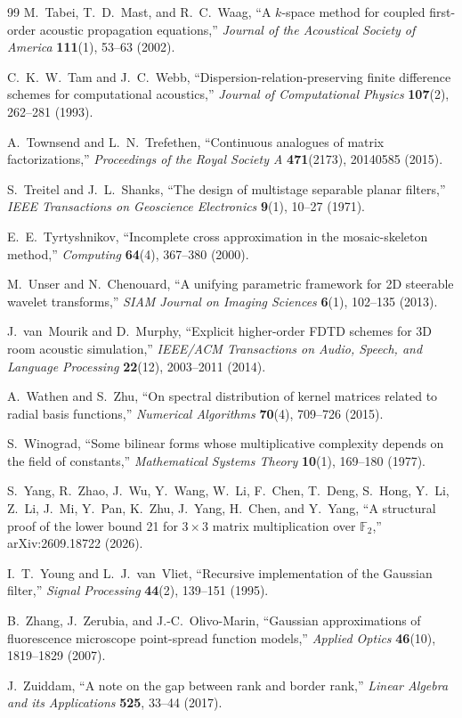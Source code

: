 \documentclass[11pt,a4paper]{article}
\theoremstyle{plain}
\theoremstyle{definition}
\begin{document}
\begin{thebibliography}{99}
M.~Tabei, T.~D.~Mast, and R.~C.~Waag,
``A $k$-space method for coupled first-order acoustic propagation equations,''
\emph{Journal of the Acoustical Society of America} \textbf{111}(1), 53--63 (2002).

C.~K.~W.~Tam and J.~C.~Webb,
``Dispersion-relation-preserving finite difference schemes for computational acoustics,''
\emph{Journal of Computational Physics} \textbf{107}(2), 262--281 (1993).

A.~Townsend and L.~N.~Trefethen,
``Continuous analogues of matrix factorizations,''
\emph{Proceedings of the Royal Society A} \textbf{471}(2173), 20140585 (2015).

S.~Treitel and J.~L.~Shanks,
``The design of multistage separable planar filters,''
\emph{IEEE Transactions on Geoscience Electronics} \textbf{9}(1), 10--27 (1971).

E.~E.~Tyrtyshnikov,
``Incomplete cross approximation in the mosaic-skeleton method,''
\emph{Computing} \textbf{64}(4), 367--380 (2000).

M.~Unser and N.~Chenouard,
``A unifying parametric framework for 2D steerable wavelet transforms,''
\emph{SIAM Journal on Imaging Sciences} \textbf{6}(1), 102--135 (2013).

J.~van~Mourik and D.~Murphy,
``Explicit higher-order FDTD schemes for 3D room acoustic simulation,''
\emph{IEEE/ACM Transactions on Audio, Speech, and Language Processing} \textbf{22}(12), 2003--2011 (2014).

A.~Wathen and S.~Zhu,
``On spectral distribution of kernel matrices related to radial basis functions,''
\emph{Numerical Algorithms} \textbf{70}(4), 709--726 (2015).

S.~Winograd,
``Some bilinear forms whose multiplicative complexity depends on the field of constants,''
\emph{Mathematical Systems Theory} \textbf{10}(1), 169--180 (1977).

S.~Yang, R.~Zhao, J.~Wu, Y.~Wang, W.~Li, F.~Chen, T.~Deng, S.~Hong, Y.~Li, Z.~Li, J.~Mi, Y.~Pan, K.~Zhu, J.~Yang, H.~Chen, and Y.~Yang,
``A structural proof of the lower bound 21 for $3\times 3$ matrix multiplication over $\mathbb{F}_2$,''
arXiv:2609.18722 (2026).

I.~T.~Young and L.~J.~van~Vliet,
``Recursive implementation of the Gaussian filter,''
\emph{Signal Processing} \textbf{44}(2), 139--151 (1995).

B.~Zhang, J.~Zerubia, and J.-C.~Olivo-Marin,
``Gaussian approximations of fluorescence microscope point-spread function models,''
\emph{Applied Optics} \textbf{46}(10), 1819--1829 (2007).

J.~Zuiddam,
``A note on the gap between rank and border rank,''
\emph{Linear Algebra and its Applications} \textbf{525}, 33--44 (2017).

\end{thebibliography}
\end{document}
